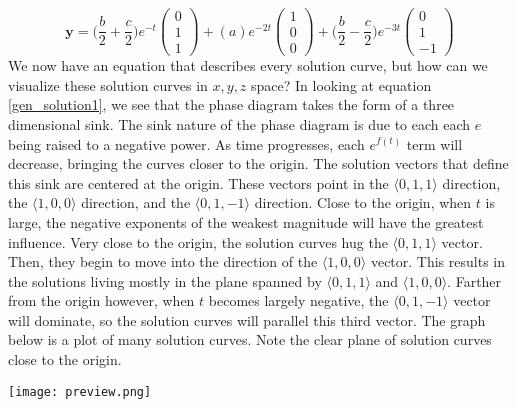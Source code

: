 \documentclass[a4paper]{article}
\newcommand{\myvec}[1]{\langle#1\rangle}
\begin{document}
\begin{equation}
	\mathbf{y} = \bigg(\frac{b}{2}+\frac{c}{2}\bigg)e^{-t} \begin{pmatrix} 0 \\ 1 \\ 1 \end{pmatrix}
	+ (a)e^{-2t} \begin{pmatrix} 1 \\ 0 \\ 0 \end{pmatrix}
	+ \bigg(\frac{b}{2}-\frac{c}{2}\bigg)e^{-3t} \begin{pmatrix} 0 \\ 1 \\ -1 \end{pmatrix}
	\label{init_cond_solution}
\end{equation}
We now have an equation that describes every solution curve, but how can we visualize these solution curves in $x,y,z$ space? In looking at equation \ref{gen_solution1}, we see that the phase diagram takes the form of a three dimensional sink. The sink nature of the phase diagram is due to each each $e$ being raised to a negative power. As time progresses, each $e^{f(t)}$ term will decrease, bringing the curves closer to the origin. The solution vectors that define this sink are centered at the origin. These vectors point in the $\myvec{0,1,1}$ direction, the $\myvec{1,0,0}$ direction, and the $\myvec{0,1,-1}$ direction. Close to the origin, when $t$ is large, the negative exponents of the weakest magnitude will have the greatest influence. Very close to the origin, the solution curves hug the $\myvec{0,1,1}$ vector. Then, they begin to move into the direction of the $\myvec{1,0,0}$ vector. This results in the solutions living mostly in the plane spanned by $\myvec{0,1,1}$ and $\myvec{1,0,0}$. Farther from the origin however, when $t$ becomes largely negative, the $\myvec{0,1,-1}$ vector will dominate, so the solution curves will parallel this third vector. The graph below is a plot of many solution curves. Note the clear plane of solution curves close to the origin.

\begin{center}
	\texttt{[image: preview.png]}
\end{center}
 
\end{document}

